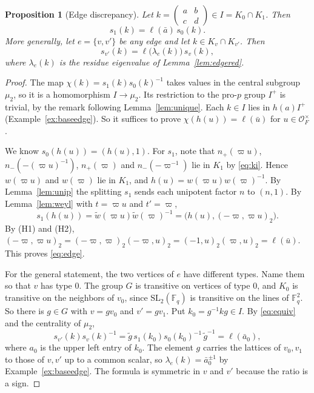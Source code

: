 \documentclass[12pt,letterpaper]{article}
\numberwithin{equation}{section}
\newtheorem{proposition}[theorem]{Proposition}
\theoremstyle{definition}
\theoremstyle{remark}
\newcommand{\OO}{\mathcal O_F}
\newcommand{\kk}{\mathbb F_q}
\newcommand{\np}{n_{+}}
\newcommand{\nm}{n_{-}}
\newcommand{\sm}[4]{\left(\begin{smallmatrix}#1&#2\\#3&#4\end{smallmatrix}\right)}
\begin{document}
\begin{proposition}[Edge discrepancy]\label{prop:edge}
Let $k=\sm abcd\in I=K_0\cap K_1$. Then
\begin{equation}\label{eq:edge}
 s_1(k)=\ell(\bar a)\,s_0(k).
\end{equation}
More generally, let $e=\{v,v'\}$ be any edge and let $k\in K_v\cap K_{v'}$. Then
\begin{equation}\label{eq:edgegen}
 s_{v'}(k)=\ell\bigl(\lambda_e(k)\bigr)\,s_v(k),
\end{equation}
where $\lambda_e(k)$ is the residue eigenvalue of Lemma~\ref{lem:edgered}.
\end{proposition}
\begin{proof}
The map $\chi(k)=s_1(k)s_0(k)^{-1}$ takes values in the central subgroup $\mu_2$, so it is a homomorphism $I\to\mu_2$. Its restriction to the pro-$p$ group $I^+$ is trivial, by the remark following Lemma~\ref{lem:unique}. Each $k\in I$ lies in $h(a)I^+$ (Example~\ref{ex:baseedge}). So it suffices to prove $\chi(h(u))=\ell(\bar u)$ for $u\in\OO^\times$.

We know $s_0(h(u))=(h(u),1)$. For $s_1$, note that $\np(\varpi u)$, $\nm(-(\varpi u)^{-1})$, $\np(\varpi)$ and $\nm(-\varpi^{-1})$ lie in $K_1$ by \eqref{eq:ki}. Hence $w(\varpi u)$ and $w(\varpi)$ lie in $K_1$, and $h(u)=w(\varpi u)w(\varpi)^{-1}$. By Lemma~\ref{lem:unip} the splitting $s_1$ sends each unipotent factor $n$ to $(n,1)$. By Lemma~\ref{lem:weyl} with $t=\varpi u$ and $t'=\varpi$,
\[
 s_1(h(u))=\widetilde w(\varpi u)\widetilde w(\varpi)^{-1}
 =\bigl(h(u),(-\varpi,\varpi u)_2\bigr).
\]
By (H1) and (H2), $(-\varpi,\varpi u)_2=(-\varpi,\varpi)_2(-\varpi,u)_2=(-1,u)_2(\varpi,u)_2=\ell(\bar u)$. This proves \eqref{eq:edge}.

For the general statement, the two vertices of $e$ have different types. Name them so that $v$ has type $0$. The group $G$ is transitive on vertices of type $0$, and $K_0$ is transitive on the neighbors of $v_0$, since $\mathrm{SL}_2(\kk)$ is transitive on the lines of $\kk^2$. So there is $g\in G$ with $v=gv_0$ and $v'=gv_1$. Put $k_0=g^{-1}kg\in I$. By \eqref{eq:equiv} and the centrality of $\mu_2$,
\[
 s_{v'}(k)s_v(k)^{-1}=\widetilde g\,s_1(k_0)s_0(k_0)^{-1}\,\widetilde g^{-1}=\ell(\bar a_0),
\]
where $a_0$ is the upper left entry of $k_0$. The element $g$ carries the lattices of $v_0,v_1$ to those of $v,v'$ up to a common scalar, so $\lambda_e(k)=\bar a_0^{\pm1}$ by Example~\ref{ex:baseedge}. The formula is symmetric in $v$ and $v'$ because the ratio is a sign.
\end{proof}
\end{document}
